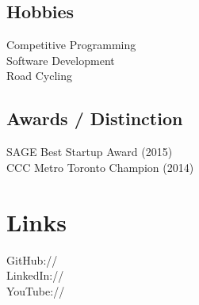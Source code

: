 \documentclass[]{deedy-resume-openfont}
\begin{document}
\begin{minipage}[t]{0.33\textwidth}
\subsection{Hobbies}
\textbullet{} Competitive Programming\\
\textbullet{} Software Development\\
\textbullet{} Road Cycling\\

\vspace{2mm}

\subsection{Awards / Distinction}
\textbullet{} SAGE Best Startup Award (2015) \\
\textbullet{} CCC Metro Toronto Champion (2014) \\

\vspace{1mm}


\section{Links} 
GitHub:// \href{https://github.com/MathBunny}{} \\
LinkedIn://  \href{https://www.linkedin.com/in/horatiulazu}{} \\
YouTube://  \href{https://www.youtube.com/user/SoftwareEngenius}{} \\
\sectionsep

%
%

\end{minipage} 
\hfill
\end{document}
